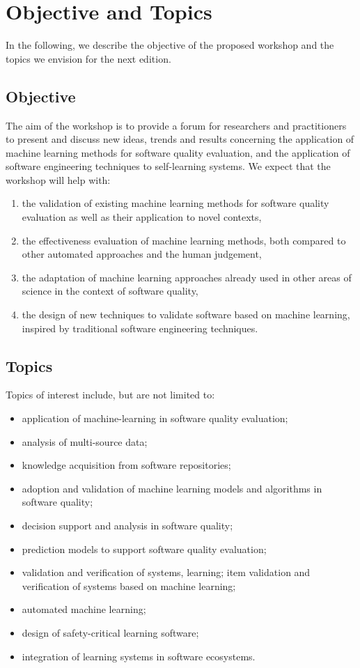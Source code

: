 \section{Objective and Topics}
\label{sec:objective}

In the following, we describe the objective of the proposed workshop and the topics we envision for the next edition.

\subsection{Objective}
The aim of the workshop is to provide a forum for researchers and practitioners to present and discuss new ideas, trends and results concerning the application of machine learning methods for software quality evaluation, and the application of software engineering techniques to self-learning systems.
We expect that the workshop will help with:
\begin{enumerate}
    \item the validation of existing machine learning methods for software quality evaluation as well as their application to novel contexts,
    \item the effectiveness evaluation of machine learning methods, both compared to other automated approaches and the human judgement,
    \item the adaptation of machine learning approaches already used in other areas of science in the context of software quality,
    \item the design of new techniques to validate software based on machine learning, inspired by traditional software engineering techniques.
\end{enumerate}

\subsection{Topics}
Topics of interest include, but are not limited to:
\begin{itemize}[itemsep=0.5em]
    \item application of machine-learning in software quality evaluation;
    \item analysis of multi-source data;
    \item knowledge acquisition from software repositories;
    \item adoption and validation of machine learning models and algorithms in software quality;
    \item decision support and analysis in software quality;
    \item prediction models to support software quality evaluation;
    \item validation and verification of systems, learning;
    item  validation and verification of systems based on machine learning;
    \item automated machine learning;
    \item design of safety-critical learning software;
    \item integration of learning systems in software ecosystems.
\end{itemize} 